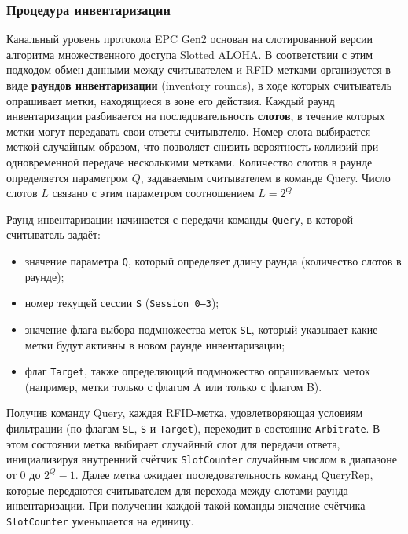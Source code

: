 \documentclass[12pt]{article}
\theoremstyle{definition}
\begin{document}
\subsubsection{Процедура инвентаризации}

Канальный уровень протокола EPC Gen2 основан на слотированной версии алгоритма множественного доступа Slotted ALOHA. В соответствии с этим подходом обмен данными между считывателем и RFID-метками организуется в виде \textbf{раундов инвентаризации} (inventory rounds), в ходе которых считыватель опрашивает метки, находящиеся в зоне его действия. Каждый раунд инвентаризации разбивается на последовательность \textbf{слотов}, в течение которых метки могут передавать свои ответы считывателю. Номер слота выбирается меткой случайным образом, что позволяет снизить вероятность коллизий при одновременной передаче несколькими метками. Количество слотов в раунде определяется параметром $Q$, задаваемым считывателем в команде Query. Число слотов $L$ связано с этим параметром соотношением $L = 2^Q$

Раунд инвентаризации начинается с передачи команды \texttt{Query}, в которой считыватель задаёт:

\begin{itemize}
    \item значение параметра \texttt{Q}, который определяет длину раунда (количество слотов в раунде);
    \item номер текущей сессии \texttt{S} (\texttt{Session 0--3});
    \item значение флага выбора подмножества меток \texttt{SL}, который указывает какие метки будут активны в новом раунде инвентаризации;
    \item флаг \texttt{Target}, также определяющий подмножество опрашиваемых меток (например, метки только с флагом A или только с флагом B).
\end{itemize}

Получив команду Query, каждая RFID-метка, удовлетворяющая условиям фильтрации (по флагам \texttt{SL}, \texttt{S} и \texttt{Target}), переходит в состояние \texttt{Arbitrate}. В этом состоянии метка выбирает случайный слот для передачи ответа, инициализируя внутренний счётчик \texttt{SlotCounter} случайным числом в диапазоне от $0$ до $2^Q - 1$. Далее метка ожидает последовательность команд QueryRep, которые передаются считывателем для перехода между слотами раунда инвентаризации. При получении каждой такой команды значение счётчика \texttt{SlotCounter} уменьшается на единицу.
\end{document}
